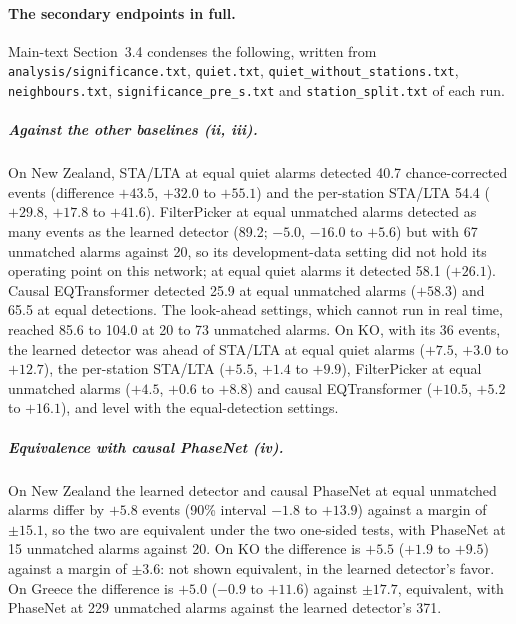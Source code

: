 \documentclass[11pt,a4paper]{article}
\newcommand{\stalta}{STA/LTA}
\newcommand{\tool}[1]{\nolinkurl{#1}}
\begin{document}
\paragraph{The secondary endpoints in full.} Main-text Section~3.4 condenses the
following, written from \tool{analysis/significance.txt}, \tool{quiet.txt},
\tool{quiet\_without\_stations.txt}, \tool{neighbours.txt},
\tool{significance\_pre\_s.txt} and \tool{station\_split.txt} of each run.

\subparagraph{Against the other baselines (ii, iii).} On New Zealand, \stalta{} at equal
quiet alarms detected 40.7 chance-corrected events (difference $+43.5$, $+32.0$ to
$+55.1$) and the per-station \stalta{} 54.4 ($+29.8$, $+17.8$ to $+41.6$).
FilterPicker at equal unmatched alarms detected as many events as the learned
detector (89.2; $-5.0$, $-16.0$ to $+5.6$) but with 67 unmatched alarms against 20, so
its development-data setting did not hold its operating point on this network; at
equal quiet alarms it detected 58.1 ($+26.1$). Causal EQTransformer detected 25.9 at
equal unmatched alarms ($+58.3$) and 65.5 at equal detections. The look-ahead
settings, which cannot run in real time, reached 85.6 to 104.0 at 20 to 73 unmatched
alarms. On KO, with its 36 events, the learned detector was ahead of \stalta{} at
equal quiet alarms ($+7.5$, $+3.0$ to $+12.7$), the per-station \stalta{} ($+5.5$,
$+1.4$ to $+9.9$), FilterPicker at equal unmatched alarms ($+4.5$, $+0.6$ to $+8.8$)
and causal EQTransformer ($+10.5$, $+5.2$ to $+16.1$), and level with the
equal-detection settings.

\subparagraph{Equivalence with causal PhaseNet (iv).} On New Zealand the learned
detector and causal PhaseNet at equal unmatched alarms differ by $+5.8$ events (90\%
interval $-1.8$ to $+13.9$) against a margin of $\pm 15.1$, so the two are
equivalent under the two one-sided tests, with PhaseNet at 15 unmatched alarms
against 20. On KO the difference is $+5.5$ ($+1.9$ to $+9.5$) against a margin of
$\pm 3.6$: not shown equivalent, in the learned detector's favor. On Greece the
difference is $+5.0$ ($-0.9$ to $+11.6$) against $\pm 17.7$, equivalent, with PhaseNet
at 229 unmatched alarms against the learned detector's 371.
\end{document}
